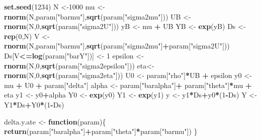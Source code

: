 \documentclass[]{book}
\newenvironment{Shaded}{\begin{snugshade}}{\end{snugshade}}
\newcommand{\KeywordTok}[1]{\textcolor[rgb]{0.13,0.29,0.53}{\textbf{#1}}}
\newcommand{\DecValTok}[1]{\textcolor[rgb]{0.00,0.00,0.81}{#1}}
\newcommand{\StringTok}[1]{\textcolor[rgb]{0.31,0.60,0.02}{#1}}
\newcommand{\ControlFlowTok}[1]{\textcolor[rgb]{0.13,0.29,0.53}{\textbf{#1}}}
\newcommand{\OperatorTok}[1]{\textcolor[rgb]{0.81,0.36,0.00}{\textbf{#1}}}
\newcommand{\NormalTok}[1]{#1}
\theoremstyle{definition}
\theoremstyle{definition}
\theoremstyle{definition}
\theoremstyle{remark}
\begin{document}
\begin{Shaded}
\begin{Highlighting}[]
\KeywordTok{set.seed}\NormalTok{(}\DecValTok{1234}\NormalTok{)}
\NormalTok{N <-}\DecValTok{1000}
\NormalTok{mu <-}\StringTok{ }\KeywordTok{rnorm}\NormalTok{(N,param[}\StringTok{"barmu"}\NormalTok{],}\KeywordTok{sqrt}\NormalTok{(param[}\StringTok{"sigma2mu"}\NormalTok{]))}
\NormalTok{UB <-}\StringTok{ }\KeywordTok{rnorm}\NormalTok{(N,}\DecValTok{0}\NormalTok{,}\KeywordTok{sqrt}\NormalTok{(param[}\StringTok{"sigma2U"}\NormalTok{]))}
\NormalTok{yB <-}\StringTok{ }\NormalTok{mu }\OperatorTok{+}\StringTok{ }\NormalTok{UB }
\NormalTok{YB <-}\StringTok{ }\KeywordTok{exp}\NormalTok{(yB)}
\NormalTok{Ds <-}\StringTok{ }\KeywordTok{rep}\NormalTok{(}\DecValTok{0}\NormalTok{,N)}
\NormalTok{V <-}\StringTok{ }\KeywordTok{rnorm}\NormalTok{(N,param[}\StringTok{"barmu"}\NormalTok{],}\KeywordTok{sqrt}\NormalTok{(param[}\StringTok{"sigma2mu"}\NormalTok{]}\OperatorTok{+}\NormalTok{param[}\StringTok{"sigma2U"}\NormalTok{]))}
\NormalTok{Ds[V}\OperatorTok{<=}\KeywordTok{log}\NormalTok{(param[}\StringTok{"barY"}\NormalTok{])] <-}\StringTok{ }\DecValTok{1} 
\NormalTok{epsilon <-}\StringTok{ }\KeywordTok{rnorm}\NormalTok{(N,}\DecValTok{0}\NormalTok{,}\KeywordTok{sqrt}\NormalTok{(param[}\StringTok{"sigma2epsilon"}\NormalTok{]))}
\NormalTok{eta<-}\StringTok{ }\KeywordTok{rnorm}\NormalTok{(N,}\DecValTok{0}\NormalTok{,}\KeywordTok{sqrt}\NormalTok{(param[}\StringTok{"sigma2eta"}\NormalTok{]))}
\NormalTok{U0 <-}\StringTok{ }\NormalTok{param[}\StringTok{"rho"}\NormalTok{]}\OperatorTok{*}\NormalTok{UB }\OperatorTok{+}\StringTok{ }\NormalTok{epsilon}
\NormalTok{y0 <-}\StringTok{ }\NormalTok{mu }\OperatorTok{+}\StringTok{  }\NormalTok{U0 }\OperatorTok{+}\StringTok{ }\NormalTok{param[}\StringTok{"delta"}\NormalTok{]}
\NormalTok{alpha <-}\StringTok{ }\NormalTok{param[}\StringTok{"baralpha"}\NormalTok{]}\OperatorTok{+}\StringTok{  }\NormalTok{param[}\StringTok{"theta"}\NormalTok{]}\OperatorTok{*}\NormalTok{mu }\OperatorTok{+}\StringTok{ }\NormalTok{eta}
\NormalTok{y1 <-}\StringTok{ }\NormalTok{y0}\OperatorTok{+}\NormalTok{alpha}
\NormalTok{Y0 <-}\StringTok{ }\KeywordTok{exp}\NormalTok{(y0)}
\NormalTok{Y1 <-}\StringTok{ }\KeywordTok{exp}\NormalTok{(y1)}
\NormalTok{y <-}\StringTok{ }\NormalTok{y1}\OperatorTok{*}\NormalTok{Ds}\OperatorTok{+}\NormalTok{y0}\OperatorTok{*}\NormalTok{(}\DecValTok{1}\OperatorTok{-}\NormalTok{Ds)}
\NormalTok{Y <-}\StringTok{ }\NormalTok{Y1}\OperatorTok{*}\NormalTok{Ds}\OperatorTok{+}\NormalTok{Y0}\OperatorTok{*}\NormalTok{(}\DecValTok{1}\OperatorTok{-}\NormalTok{Ds)}

\NormalTok{delta.y.ate <-}\StringTok{ }\ControlFlowTok{function}\NormalTok{(param)\{}
  \KeywordTok{return}\NormalTok{(param[}\StringTok{"baralpha"}\NormalTok{]}\OperatorTok{+}\NormalTok{param[}\StringTok{"theta"}\NormalTok{]}\OperatorTok{*}\NormalTok{param[}\StringTok{"barmu"}\NormalTok{])}
\NormalTok{\}}
\end{Highlighting}
\end{Shaded}
\end{document}
